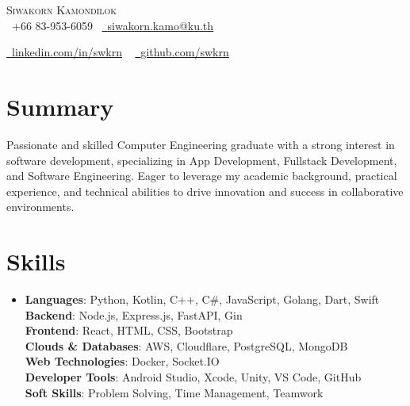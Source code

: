 \documentclass[a4paper,11pt]{article}
\begin{document}
\begin{center}
  {\Huge \scshape Siwakorn Kamondilok} \\ \vspace{5pt}
  \small \raisebox{-0.1\height}\faPhone\ +66 83-953-6059~ \href{mailto:siwakorn.kamo@ku.th}{\raisebox{-0.2\height}\faEnvelope\  \underline{siwakorn.kamo@ku.th}} ~

  \vspace{2pt}
  \href{https://www.linkedin.com/in/swkrn/}{\raisebox{-0.2\height}\faLinkedin\ \underline{linkedin.com/in/swkrn}}  ~
  \href{https://github.com/swkrn}{\raisebox{-0.2\height}\faGithub\ \underline{github.com/swkrn}}
  \vspace{-8pt}
\end{center}

\vspace{-5pt}



\section{Summary}
Passionate and skilled Computer Engineering graduate with a strong interest in software development, 
specializing in App Development, Fullstack Development, and Software Engineering. Eager to leverage my academic background, 
practical experience, and technical abilities to drive innovation and success in collaborative environments.



\section{Skills}
\begin{itemize}[leftmargin=0.15in, label={}]
  \item{
        \textbf{Languages}{: Python, Kotlin, C++, C\#, JavaScript, Golang, Dart, Swift} \\
        \textbf{Backend}{: Node.js, Express.js, FastAPI, Gin}\\
        \textbf{Frontend}{: React, HTML, CSS, Bootstrap} \\
        \textbf{Clouds \& Databases}{: AWS, Cloudflare, PostgreSQL, MongoDB} \\
        \textbf{Web Technologies}{: Docker, Socket.IO} \\
        \textbf{Developer Tools}{: Android Studio, Xcode, Unity, VS Code, GitHub} \\
        \textbf{Soft Skills}{: Problem Solving, Time Management, Teamwork} \\
        }
\end{itemize}
\vspace{-10pt}
\end{document}
